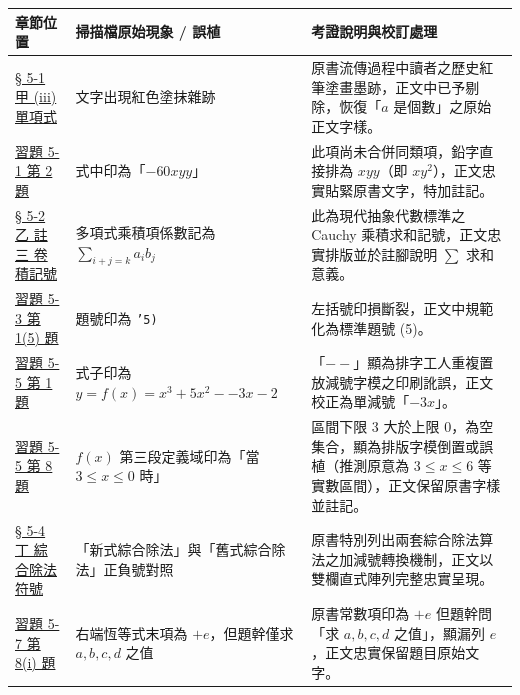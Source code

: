 \documentclass[a4paper,12pt,twoside]{article}
\begin{document}
\begin{table}[H]
\centering
\small
\renewcommand{\arraystretch}{1.35}
\begin{tabularx}{\textwidth}{|p{3.2cm}|p{3.8cm}|X|}
\hline
\textbf{章節位置} & \textbf{掃描檔原始現象 / 誤植} & \textbf{考證說明與校訂處理} \\ \hline

\hyperref[subsec:5-1-a]{§ 5-1 甲 (iii) 單項式} & 
文字出現紅色塗抹雜跡 & 
原書流傳過程中讀者之歷史紅筆塗畫墨跡，正文中已予剔除，恢復「$a$ 是個數」之原始正文字樣。 \\ \hline

\hyperref[sec:ex5-1]{習題 5-1 第 2 題} & 
式中印為「$-60xyy$」 & 
此項尚未合併同類項，鉛字直接排為 $xyy$（即 $xy^2$），正文忠實貼緊原書文字，特加註記。 \\ \hline

\hyperref[subsec:5-2-b]{§ 5-2 乙 註三 卷積記號} & 
多項式乘積項係數記為 $\sum_{i+j=k} a_i b_j$ & 
此為現代抽象代數標準之 Cauchy 乘積求和記號，正文忠實排版並於註腳說明 $\sum$ 求和意義。 \\ \hline

\hyperref[item:ex5-3-1-5]{習題 5-3 第 1(5) 題} & 
題號印為 \texttt{'5)} & 
左括號印損斷裂，正文中規範化為標準題號 (5)。 \\ \hline

\hyperref[item:ex5-5-1]{習題 5-5 第 1 題} & 
式子印為 $y=f(x)=x^3+5x^2--3x-2$ & 
「$--$」顯為排字工人重複置放減號字模之印刷訛誤，正文校正為單減號「$-3x$」。 \\ \hline

\hyperref[item:ex5-5-8]{習題 5-5 第 8 題} & 
$f(x)$ 第三段定義域印為「當 $3 \le x \le 0$ 時」 & 
區間下限 3 大於上限 0，為空集合，顯為排版字模倒置或誤植（推測原意為 $3 \le x \le 6$ 等實數區間），正文保留原書字樣並註記。 \\ \hline

\hyperref[subsec:5-4-d]{§ 5-4 丁 綜合除法符號} & 
「新式綜合除法」與「舊式綜合除法」正負號對照 & 
原書特別列出兩套綜合除法算法之加減號轉換機制，正文以雙欄直式陣列完整忠實呈現。 \\ \hline

\hyperref[sec:ex5-7]{習題 5-7 第 8(i) 題} & 
右端恆等式末項為 $+e$，但題幹僅求 $a,b,c,d$ 之值 & 
原書常數項印為 $+e$ 但題幹問「求 $a,b,c,d$ 之值」，顯漏列 $e$，正文忠實保留題目原始文字。 \\ \hline

\end{tabularx}
\end{table}

\clearpage
\tableofcontents
\newpage


\end{document}
